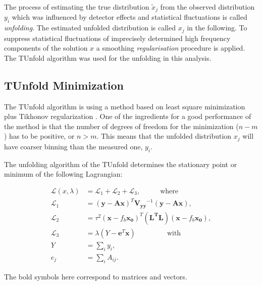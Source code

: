 The process of estimating the true distribution $\tilde{x}_{j}$ from the observed distribution $y_{i}$ which was influenced
by detector effects and statistical fluctuations is called \textit{unfolding}. The estimated unfolded distribution is called
$x_{j}$ in the following. To suppress statistical fluctuations of imprecisely determined high frequency components of the 
solution $x$ a smoothing \textit{regularisation} procedure is applied. The TUnfold \cite{Schmitt:2012kp} algorithm was used 
for the unfolding in this analysis.

\subsection{TUnfold Minimization}\label{ssec:TUmini}

The TUnfold algorithm\cite{Schmitt:2012kp} is using a method based on least square minimization plus Tikhonov regularization 
\cite{Tikhonov:1963}. One of the ingredients for a good performance of the method is that the number of degrees of freedom 
for the minimization ($n - m$) has to be positive, or $n > m$. This means that the unfolded distribution $x_j$ will have 
coarser binning than the measured one, $y_{i}$.

The unfolding algorithm of the TUnfold determines the stationary point or minimum of the following Lagrangian:

\begin{align}
 \mathcal{L}(x, \lambda) & = \mathcal{L}_{1} + \mathcal{L}_{2} + \mathcal{L}_{3}, \;\;\;\;\;\;\;\;\;\; \textrm{where}\\
 \mathcal{L}_{1} & = (\mathbf{y} - \mathbf{A}\mathbf{x})^{T} \mathbf{V_{yy}}^{-1}(\mathbf{y} - \mathbf{A}\mathbf{x}),\\
 \mathcal{L}_{2} & = \tau^{2}(\mathbf{x} - f_{b}\mathbf{x_{0}})^{T} (\mathbf{L^{T}L}) (\mathbf{x} - f_{b}\mathbf{x_{0}}), \\
 \mathcal{L}_{3} & = \lambda(Y -\mathbf{e}^{T}\mathbf{x}) \;\;\;\;\;\;\;\;\;\;\;\;\;\;\;\; \textrm{with} \\
 Y & = \sum_{i} y_{i}, \\
 e_{j} & = \sum_{i} A_{ij}.
\end{align}

The bold symbols here correspond to matrices and vectors.


